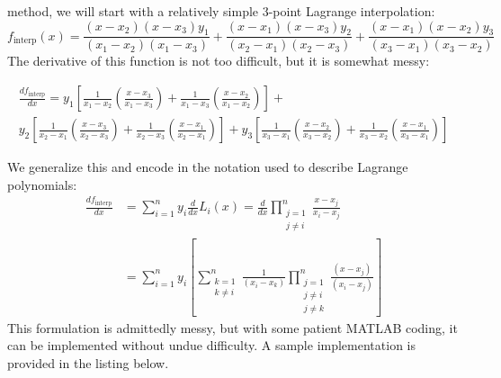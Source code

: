  method, we will start with a relatively simple 3-point Lagrange interpolation:
\begin{equation*}
f_{\text{interp}}(x) = \frac{(x - x_2)(x - x_3)y_1}{(x_1 - x_2)(x_1 - x_3)} + \frac{(x - x_1)(x-x_3)y_2}{(x_2 - x_1)(x_2 - x_3)} + \frac{(x - x_1)(x-x_2)y_3}{(x_3-x_1)(x_3 - x_2)}
\end{equation*}
The derivative of this function is not too difficult, but it is somewhat messy:
\begin{fullwidth}
\begin{multline*}
\frac{df_{\text{interp}}}{dx} = y_1\left[\frac{1}{x_1 - x_2}\left(\frac{x - x_3}{x_1 - x_3}\right) + \frac{1}{x_1-x_3}\left(\frac{x - x_2}{x_1 - x_2} \right)\right] + \\ y_2\left[\frac{1}{x_2 - x_1}\left(\frac{x - x_3}{x_2 - x_3}\right) + \frac{1}{x_2 - x_3}\left(\frac{x - x_1}{x_2 - x_1}\right) \right] + y_3 \left[\frac{1}{x_3 - x_1}\left(\frac{x - x_2}{x_3 - x_2}\right) + \frac{1}{x_3 - x_2}\left(\frac{x - x_1}{x_3 - x_1}\right) \right]
\end{multline*}
\end{fullwidth}
We generalize this and encode in the notation used to describe Lagrange polynomials:
\begin{align}
\frac{df_{\text{interp}}}{dx} &= \sum\limits_{i=1}^{n}y_i \frac{d}{dx}L_{i}(x) = \frac{d}{dx}\prod_{\substack{j=1 \\ j \ne i}}^{n} \frac{x - x_j}{x_i - x_j} \\ \nonumber
&= \sum\limits_{i=1}^{n}y_i\left[\sum\limits_{\substack{k = 1 \\ k \ne i}}^{n}\frac{1}{\left(x_i - x_k\right)} \prod_{\substack{j=1 \\ j \ne i \\ j \ne k}}^{n} \frac{\left(x - x_j\right)}{\left(x_i - x_j\right)} \right]
\end{align}
This formulation is admittedly messy, but with some patient MATLAB coding, it can be implemented without undue difficulty. A sample implementation is provided in the listing below.
